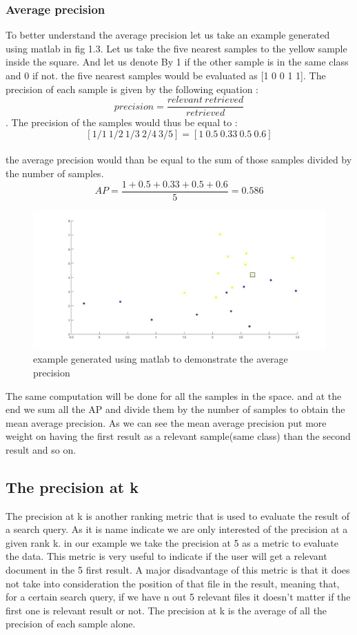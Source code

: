 \documentclass[hidelinks,12pt]{report}
\begin{document}
\subsubsection{Average precision}
To better understand the average precision let us take an example generated using matlab in fig 1.3. Let us take the five nearest samples to the yellow sample inside the square. And let us denote By 1 if the other sample is in the same class and 0 if not. the five nearest samples would be evaluated as [1 0 0 1 1]. The precision of each sample is given by the following equation : $$precision=\frac{relevant\  retrieved}{retrieved}$$. The precision of the samples would thus be equal to : $$[1/1 \  1/2 \ 1/3\  2/4\  3/5]=[1 \ 0.5 \   0.33 \ 0.5 \ 0.6]$$\\ the average precision would than be equal to the sum of those samples divided by the number of samples.$$AP=\frac{1+0.5+0.33+0.5+0.6}{5}=0.586$$
\begin{figure}[t!]
  
  \centering
	    \includegraphics[width=1\textwidth]{fig1.jpg}
    \caption{example generated using matlab to demonstrate the average precision}
\end{figure}
The same computation will be done for all the samples in the space. and at the end we sum all the AP and divide them by the number of samples to obtain the mean average precision. As we can see the mean average precision put more weight on having the first result as a relevant sample(same class) than the second result and so on.
\subsection{The precision at k}
The precision at k is another ranking metric that is used to evaluate the result of a search query. As  it is name indicate we are only interested of the precision at a given rank k. in our example we take the precision at 5 as a metric to evaluate the data. This metric is very useful to indicate if the user will get a relevant document in the 5 first result. A major disadvantage of this metric is that it does not take into consideration the position of that file in the result, meaning that, for a certain search query, if we have n out 5 relevant files it doesn't matter if the first one is relevant result or not. The precision at k is the average of all the precision of each sample alone.
\end{document}
